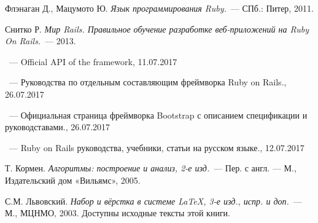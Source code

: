 \begin{thebibliography}{}

  Флэнаган Д., Мацумото Ю.
  {\em Язык программирования Ruby.}~---
  СПб.: Питер, 2011.

  Снитко Р.
  {\em Мир Rails. Правильное обучение разработке веб-приложений на Ruby On Rails.}~---
  2013.

  ~---
  Official API of the framework, 11.07.2017

  ~---
  Руководства по отдельным составляющим фреймворка Ruby on Rails., 26.07.2017


  ~---
  Официальная страница фреймворка Bootstrap с описанием
  спецификации и руководставами., 26.07.2017


  ~---
  Ruby on Rails руководства, учебники, статьи на русском языке., 12.07.2017

  Т. Кормен.
  {\em Алгоритмы: построение и анализ, 2-е изд.}~---
  Пер. с англ. --- М., Издательский дом «Вильямс», 2005.

  С.М. Львовский.
  {\em Набор и вёрстка в системе \LaTeX, 3-е изд., испр. и доп.}~---
  М., МЦНМО, 2003. Доступны исходные тексты этой книги.

\end{thebibliography}
